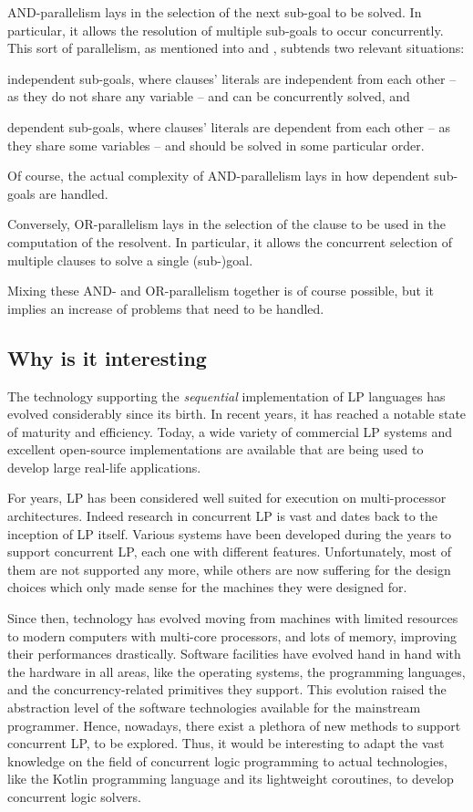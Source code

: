 \documentclass[12pt,a4paper,openright,twoside]{book}
\begin{document}
AND-parallelism lays in the selection of the next sub-goal to be solved.
%
In particular, it allows the resolution of multiple sub-goals to occur concurrently.
%
This sort of parallelism, as mentioned into \cite{Zhang94} and \cite{YuhuaHL93}, subtends two relevant situations:
%
\begin{inlinelist}
    \item independent sub-goals, where clauses' literals are independent from each other -- as they do not share any variable -- and can be concurrently solved, and
    \item dependent sub-goals, where clauses' literals are dependent from each other -- as they share some variables -- and should be solved in some particular order.
\end{inlinelist}
%
Of course, the actual complexity of AND-parallelism lays in how dependent sub-goals are handled.

Conversely, OR-parallelism lays in the selection of the clause to be used in the computation of the resolvent.
%
In particular, it allows the concurrent selection of multiple clauses to solve a single (sub-)goal.

Mixing these AND- and OR-parallelism together is of course possible, but it implies an increase of problems that need to be handled.

\subsection{Why is it interesting}

The technology supporting the \emph{sequential} implementation of LP languages has evolved considerably since its birth.
%
In recent years, it has reached a notable state of maturity and efficiency.
%
Today, a wide variety of commercial LP systems and excellent open-source implementations are available that are being used to develop large real-life applications.

For years, LP has been considered well suited for execution on multi-processor architectures.
%
Indeed research in concurrent LP is vast and dates back to the inception of LP itself.
%
Various systems have been developed during the years to support concurrent LP, each one with different features.
%
Unfortunately, most of them are not supported any more, while others are now suffering for the design choices which only made sense for the machines they were designed for.

Since then, technology has evolved moving from machines with limited resources to modern computers with multi-core processors, and lots of memory, improving their performances drastically.
%
Software facilities have evolved hand in hand with the hardware in all areas, like the operating systems, the programming languages, and the concurrency-related primitives they support.
%
This evolution raised the abstraction level of the software technologies available for the mainstream programmer.
%
Hence, nowadays, there exist a plethora of new methods to support concurrent LP, to be explored.
%
Thus, it would be interesting to adapt the vast knowledge on the field of concurrent logic programming to actual technologies, like the Kotlin programming language and its lightweight coroutines, to develop concurrent logic solvers.
\end{document}
